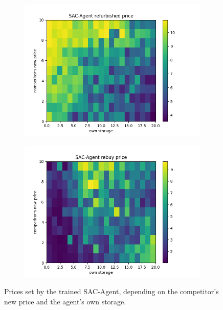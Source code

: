 \begin{figure}[ht]
	\centering
	\begin{subfigure}[t]{0.49\textwidth}
		\centering
		\includegraphics[width = \textwidth]{images/experiments/SACDuopoly/policyanalyzer/Appendix/comp_new_own_storage/refurbished_price.png}\\
		\label{fig:AppendixSACDuopolyPolicyanalyser1refurbished}
	\end{subfigure}
	\begin{subfigure}[t]{0.49\textwidth}
		\centering
		\includegraphics[width = \textwidth]{images/experiments/SACDuopoly/policyanalyzer/Appendix/comp_new_own_storage/rebuy_price.png}\\
		\label{fig:AppendixSACDuopolyPolicyanalyser1rebuy}
	\end{subfigure}
	\caption{Prices set by the trained SAC-Agent, depending on the competitor's new price and the agent's own storage.}\label{fig:AppendixSACDuopolyPolicyanalyser1}
\end{figure}

